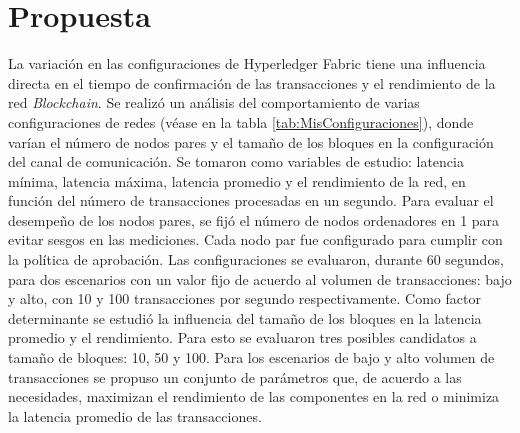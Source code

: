 \chapter{Propuesta}\label{chapter:proposal}

La variaci\'on en las configuraciones de Hyperledger Fabric tiene una influencia directa en el tiempo de confirmaci\'on de las transacciones y el rendimiento de la red \emph{Blockchain}. Se realiz\'o un an\'alisis del comportamiento de varias configuraciones de redes (v\'ease en la tabla \ref{tab:MisConfiguraciones}), donde var\'ian el n\'umero de nodos pares y el tama\~no de los bloques en la configuraci\'on del canal de comunicaci\'on. Se tomaron como variables de estudio: latencia m\'inima, latencia m\'axima, latencia promedio y el rendimiento de la red, en funci\'on del n\'umero de transacciones procesadas en un segundo. Para evaluar el desempe\~no de los nodos pares, se fij\'o el n\'umero de nodos ordenadores en 1 para evitar sesgos en las mediciones. Cada nodo par fue configurado para cumplir con la pol\'itica de aprobaci\'on. Las configuraciones se evaluaron, durante 60 segundos, para dos escenarios con un valor fijo de acuerdo al volumen de transacciones: bajo y alto, con 10 y 100 transacciones por segundo respectivamente. Como factor determinante se estudi\'o la influencia del tama\~no de los bloques en la latencia promedio y el rendimiento. Para esto se evaluaron tres posibles candidatos a tama\~no de bloques: 10, 50 y 100. Para los escenarios de bajo y alto volumen de transacciones se propuso un conjunto de par\'ametros que, de acuerdo a las necesidades, maximizan el rendimiento de las componentes en la red o minimiza la latencia promedio de las transacciones.